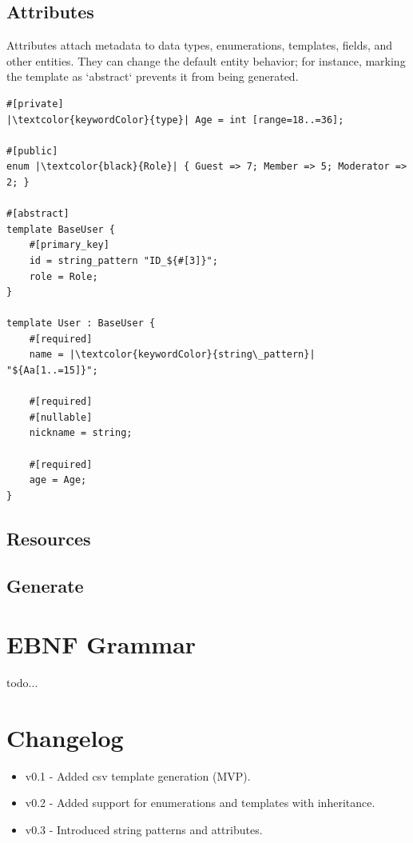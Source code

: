 \documentclass[11pt,a4paper]{article}
\begin{document}
    \subsection{Attributes}
    Attributes attach metadata to data types, enumerations, templates, fields, and other entities. 
    They can change the default entity behavior; for instance, marking the template as `abstract` prevents 
    it from being generated.
    \begin{listing}[H]
       \begin{verbatim}
#[private]
|\textcolor{keywordColor}{type}| Age = int [range=18..=36]; 

#[public]
enum |\textcolor{black}{Role}| { Guest => 7; Member => 5; Moderator => 2; }

#[abstract]
template BaseUser {
    #[primary_key]
    id = string_pattern "ID_${#[3]}";
    role = Role;
}

template User : BaseUser {
    #[required]
    name = |\textcolor{keywordColor}{string\_pattern}| "${Aa[1..=15]}";
    
    #[required]
    #[nullable]
    nickname = string;
    
    #[required]
    age = Age;
}

        \end{verbatim}
        \caption{Attributes example}
        \centering
        \label{listing:attributes}
    \end{listing}
    \pagebreak

    \subsection{Resources}
    \pagebreak

    \subsection{Generate}
    \pagebreak

    \appendix
    \section{EBNF Grammar}
    todo...

    \section{Changelog}
    \begin{itemize}
        \item v0.1 - Added csv template generation (MVP).
        \item v0.2 - Added support for enumerations and templates with inheritance.
        \item v0.3 - Introduced string patterns and attributes.
    \end{itemize}
\end{document}
